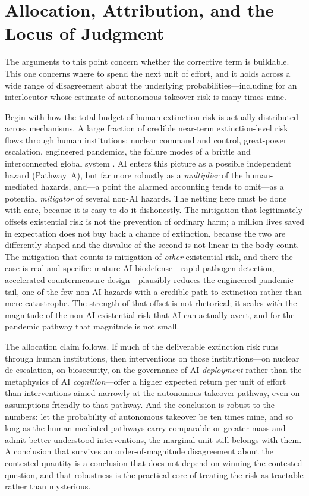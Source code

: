 \documentclass[11pt]{article}
\begin{document}
\section{Allocation, Attribution, and the Locus of Judgment}
\label{sec:allocation}

The arguments to this point concern whether the corrective term is buildable. This one concerns where to spend the next unit of effort, and it holds across a wide range of disagreement about the underlying probabilities---including for an interlocutor whose estimate of autonomous-takeover risk is many times mine.

Begin with how the total budget of human extinction risk is actually distributed across mechanisms. A large fraction of credible near-term extinction-level risk flows through human institutions: nuclear command and control, great-power escalation, engineered pandemics, the failure modes of a brittle and interconnected global system \citep{ord2020}. AI enters this picture as a possible independent hazard (Pathway~A), but far more robustly as a \emph{multiplier} of the human-mediated hazards, and---a point the alarmed accounting tends to omit---as a potential \emph{mitigator} of several non-AI hazards. The netting here must be done with care, because it is easy to do it dishonestly. The mitigation that legitimately offsets existential risk is not the prevention of ordinary harm; a million lives saved in expectation does not buy back a chance of extinction, because the two are differently shaped and the disvalue of the second is not linear in the body count. The mitigation that counts is mitigation of \emph{other} existential risk, and there the case is real and specific: mature AI biodefense---rapid pathogen detection, accelerated countermeasure design---plausibly reduces the engineered-pandemic tail, one of the few non-AI hazards with a credible path to extinction rather than mere catastrophe. The strength of that offset is not rhetorical; it scales with the magnitude of the non-AI existential risk that AI can actually avert, and for the pandemic pathway that magnitude is not small.

The allocation claim follows. If much of the deliverable extinction risk runs through human institutions, then interventions on those institutions---on nuclear de-escalation, on biosecurity, on the governance of AI \emph{deployment} rather than the metaphysics of AI \emph{cognition}---offer a higher expected return per unit of effort than interventions aimed narrowly at the autonomous-takeover pathway, even on assumptions friendly to that pathway. And the conclusion is robust to the numbers: let the probability of autonomous takeover be ten times mine, and so long as the human-mediated pathways carry comparable or greater mass and admit better-understood interventions, the marginal unit still belongs with them. A conclusion that survives an order-of-magnitude disagreement about the contested quantity is a conclusion that does not depend on winning the contested question, and that robustness is the practical core of treating the risk as tractable rather than mysterious.
\end{document}
